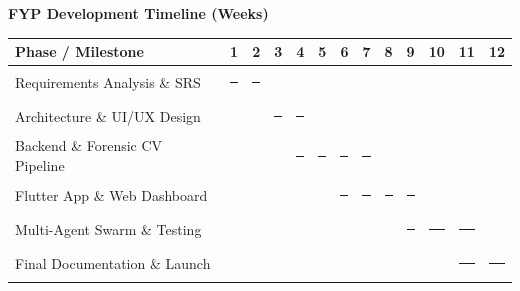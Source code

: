 \documentclass[12pt,a4paper]{article}
\begin{document}
\begin{center}
\textbf{\small FYP Development Timeline (Weeks)}\\[4pt]
\small
\begin{tabular}{|l|c|c|c|c|c|c|c|c|c|c|c|c|}
\hline
\textbf{Phase / Milestone} & \textbf{1} & \textbf{2} & \textbf{3} & \textbf{4} & \textbf{5} & \textbf{6} & \textbf{7} & \textbf{8} & \textbf{9} & \textbf{10} & \textbf{11} & \textbf{12} \\
\hline
Requirements Analysis \& SRS & \rule{12pt}{6pt} & \rule{12pt}{6pt} & & & & & & & & & & \\
\hline
Architecture \& UI/UX Design & & & \rule{12pt}{6pt} & \rule{12pt}{6pt} & & & & & & & & \\
\hline
Backend \& Forensic CV Pipeline & & & & \rule{12pt}{6pt} & \rule{12pt}{6pt} & \rule{12pt}{6pt} & \rule{12pt}{6pt} & & & & & \\
\hline
Flutter App \& Web Dashboard & & & & & & \rule{12pt}{6pt} & \rule{12pt}{6pt} & \rule{12pt}{6pt} & \rule{12pt}{6pt} & & & \\
\hline
Multi-Agent Swarm \& Testing & & & & & & & & & \rule{12pt}{6pt} & \rule{12pt}{6pt} & \rule{12pt}{6pt} & \\
\hline
Final Documentation \& Launch & & & & & & & & & & & \rule{12pt}{6pt} & \rule{12pt}{6pt} \\
\hline
\end{tabular}
\end{center}
\end{document}
